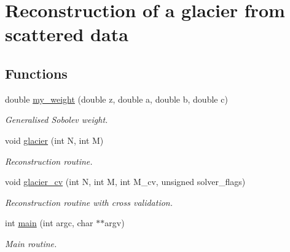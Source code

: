 \hypertarget{group__examples__solver__glacier}{
\section{Reconstruction of a glacier from scattered data}
\label{group__examples__solver__glacier}
}
\subsection*{Functions}
\begin{CompactItemize}
\item 
\hypertarget{group__examples__solver__glacier_gd58a9af5b5913fad0eb6fbc03222311e}{
double \hyperlink{group__examples__solver__glacier_gd58a9af5b5913fad0eb6fbc03222311e}{my\_\-weight} (double z, double a, double b, double c)}
\label{group__examples__solver__glacier_gd58a9af5b5913fad0eb6fbc03222311e}

\begin{CompactList}\small\item\em Generalised Sobolev weight. \item\end{CompactList}\item 
\hypertarget{group__examples__solver__glacier_g13bf59da58281908fb29158d40fa01e7}{
void \hyperlink{group__examples__solver__glacier_g13bf59da58281908fb29158d40fa01e7}{glacier} (int N, int M)}
\label{group__examples__solver__glacier_g13bf59da58281908fb29158d40fa01e7}

\begin{CompactList}\small\item\em Reconstruction routine. \item\end{CompactList}\item 
\hypertarget{group__examples__solver__glacier_gb3a4a92dab7e9d217768eeaddbc3d991}{
void \hyperlink{group__examples__solver__glacier_gb3a4a92dab7e9d217768eeaddbc3d991}{glacier\_\-cv} (int N, int M, int M\_\-cv, unsigned solver\_\-flags)}
\label{group__examples__solver__glacier_gb3a4a92dab7e9d217768eeaddbc3d991}

\begin{CompactList}\small\item\em Reconstruction routine with cross validation. \item\end{CompactList}\item 
\hypertarget{group__examples__solver__glacier_g3c04138a5bfe5d72780bb7e82a18e627}{
int \hyperlink{group__examples__solver__glacier_g3c04138a5bfe5d72780bb7e82a18e627}{main} (int argc, char $\ast$$\ast$argv)}
\label{group__examples__solver__glacier_g3c04138a5bfe5d72780bb7e82a18e627}

\begin{CompactList}\small\item\em Main routine. \item\end{CompactList}\end{CompactItemize}
